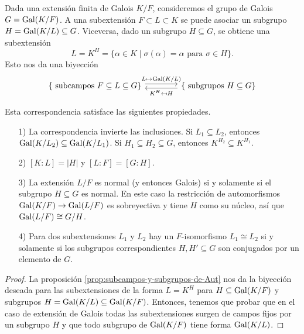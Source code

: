 \begin{teorema}
  Dada una extensión finita de Galois $K/F$, consideremos el grupo de Galois
  $G = \operatorname{Gal} (K/F)$.  A una subextensión $F \subset L \subset K$ se puede
  asociar un subgrupo $H = \operatorname{Gal} (K/L) \subseteq G$. Viceversa, dado un subgrupo
  $H \subseteq G$, se obtiene una subextensión
  $$L = K^H = \{ \alpha \in K \mid \sigma (\alpha) = \alpha \text{ para }\sigma\in H \}.$$
  Esto nos da una biyección
  \[ \begin{tikzcd}[column sep=4em]
    \{ \text{ subcampos }F \subseteq L \subseteq G \}
    \ar[shift left=0.25em]{r}{L \mapsto \Gal (K/L)} &
    \{ \text{ subgrupos }H \subseteq G \}
    \ar[shift left=0.25em]{l}{K^H \mapsfrom H}
  \end{tikzcd} \]

  Esta correspondencia satisface las siguientes propiedades.
  \begin{enumerate}
  \item[1)] La correspondencia invierte las inclusiones.
    Si $L_1 \subseteq L_2$, entonces $\operatorname{Gal} (K/L_2) \subseteq \operatorname{Gal} (K/L_1)$.
    Si $H_1 \subseteq H_2 \subseteq G$, entonces $K^{H_2} \subseteq K^{H_1}$.

  \item[2)] $[K:L] = |H|$ y $[L:F] = [G:H]$.

  \item[3)] La extensión $L/F$ es normal (y entonces Galois) si y solamente si
    el subgrupo $H \subseteq G$ es normal. En este caso la restricción de
    automorfismos $\operatorname{Gal} (K/F) \to \operatorname{Gal} (L/F)$ es sobreyectiva y tiene $H$ como
    su núcleo, así que $\operatorname{Gal} (L/F) \cong G/H$.

  \item[4)] Para dos subextensiones $L_1$ y $L_2$ hay un $F$-isomorfismo
    $L_1\cong L_2$ si y solamente si los subgrupos correspondientes
    $H, H' \subseteq G$ son conjugados por un elemento de $G$.
  \end{enumerate}

  \begin{proof}
    La proposición \ref{prop:subcampos-y-subgrupos-de-Aut} nos da la biyección
    deseada para las subextensiones de la forma $L = K^H$ para
    $H \subseteq \operatorname{Gal} (K/F)$ y subgrupos $H = \operatorname{Gal} (K/L) \subseteq \operatorname{Gal} (K/F)$.
    Entonces, tenemos que probar que en el caso de extensión de Galois todas
    las subextensiones surgen de campos fijos por un subgrupo $H$ y que
    todo subgrupo de $\operatorname{Gal} (K/F)$ tiene forma $\operatorname{Gal} (K/L)$.


\end{proof}
\end{teorema}
